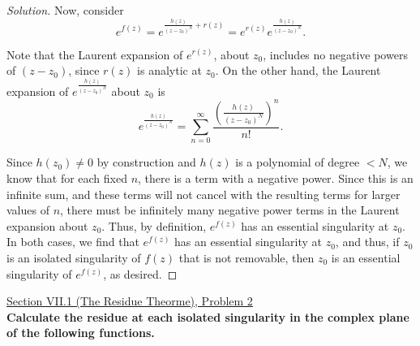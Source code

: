 \documentclass[11pt]{article}
\newcommand{\Sum}{\sum\limits_{n=0}^{\infty}}
\newenvironment{solution}
  {\renewcommand\qedsymbol{$\blacksquare$}\begin{proof}[Solution]}
  {\end{proof}}
\theoremstyle{definition}
\begin{document}
\begin{solution}
Now, consider 
\[ e^{f(z)} = e^{\frac{h(z)}{(z-z_0)^N} + r(z)} = e^{r(z)} e^{\frac{h(z)}{(z-z_0)^N}}. \]

Note that the Laurent expansion of $e^{r(z)}$, about $z_0$, includes no negative powers of $(z-z_0)$, since $r(z)$ is analytic at $z_0$. On the other hand, the Laurent expansion of $e^{\frac{h(z)}{(z-z_0)^N}}$ about $z_0$ is \[e^{\frac{h(z)}{(z-z_0)^N}} = \Sum \frac{\left( \frac{h(z)}{(z-z_0)^N}\right)^n}{n!}. \]

Since $h(z_0) \neq 0$ by construction and $h(z)$ is a polynomial of degree $<N$, we know that for each fixed $n$, there is a term with a negative power. Since this is an infinite sum, and these terms will not cancel with the resulting terms for larger values of $n$, there must be infinitely many negative power terms in the Laurent expansion about $z_0$. 
Thus, by definition, $e^{f(z)}$ has an essential singularity at $z_0$. \\

In both cases, we find that $e^{f(z)}$ has an essential singularity at $z_0$, and thus, if $z_0$ is an isolated singularity of $f(z)$ that is not removable, then $z_0$ is an essential singularity of $e^{f(z)}$, as desired. \end{solution}

\newpage

\underline{Section VII.1 (The Residue Theorme), Problem 2}\\

\textbf{Calculate the residue at each isolated singularity in the complex plane of the following functions.}
\end{document}
